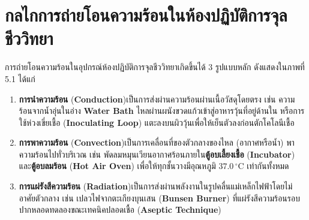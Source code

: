 \section{กลไกการถ่ายโอนความร้อนในห้องปฏิบัติการจุลชีววิทยา}

การถ่ายโอนความร้อนในอุปกรณ์ห้องปฏิบัติการจุลชีววิทยาเกิดขึ้นได้ 3 รูปแบบหลัก ดังแสดงใน\mbox{ภาพที่} 5.1 ได้แก่
\begin{enumerate}
    \item \textbf{การนำความร้อน} (\textbf{Conduction})\quad เป็นการส่งผ่านความร้อนผ่านเนื้อวัสดุโดยตรง เช่น ความร้อนจากน้ำอุ่นในอ่าง \textbf{Water Bath} ไหลผ่านผนังขวดแก้วเข้าสู่อาหารวุ้นที่อยู่ด้านใน หรือการใช้ห่วงเขี่ยเชื้อ (\textbf{Inoculating Loop}) แตะลงบนผิววุ้นเพื่อให้เย็นตัวลงก่อนตักโคโลนีเชื้อ
    \item \textbf{การพาความร้อน} (\textbf{Convection})\quad เป็นการเคลื่อนที่ของตัวกลางของไหล (อากาศหรือน้ำ) พาความร้อนไปทั่วบริเวณ เช่น พัดลมหมุนเวียนอากาศร้อนภายใน\textbf{ตู้อบเลี้ยงเชื้อ} (\textbf{Incubator}) และ\textbf{ตู้อบลมร้อน} (\textbf{Hot Air Oven}) เพื่อให้ทุกชั้นวางมีอุณหภูมิ $37.0\,^\circ\text{C}$ เท่ากันทั้งหมด
    \item \textbf{การแผ่รังสีความร้อน} (\textbf{Radiation})\quad เป็นการส่งผ่านพลังงานในรูปคลื่นแม่เหล็กไฟฟ้าโดยไม่อาศัยตัวกลาง เช่น เปลวไฟจากตะเกียงบุนเสน (\textbf{Bunsen Burner}) ที่แผ่รังสีความร้อนรอบปากหลอดทดลองขณะเทคนิคปลอดเชื้อ (\textbf{Aseptic Technique})
\end{enumerate}

